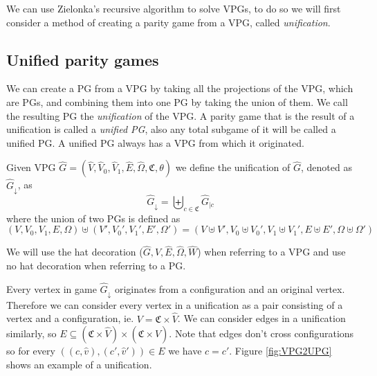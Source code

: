 We can use Zielonka's recursive algorithm to solve VPGs, to do so we will first consider a method of creating a parity game from a VPG, called \textit{unification}.
\subsection{Unified parity games}
We can create a PG from a VPG by taking all the projections of the VPG, which are PGs, and combining them into one PG by taking the union of them. We call the resulting PG the \textit{unification} of the VPG. A parity game that is the result of a unification is called a \textit{unified PG}, also any total subgame of it will be called a unified PG. A unified PG always has a VPG from which it originated.
\begin{definition}
	Given VPG $\hat{G} = (\hat{V},\hat{V}_0,\hat{V}_1, \hat{E},\hat{\Omega}, \mathfrak{C},\theta)$ we define the unification of $\hat{G}$, denoted as $\hat{G}_{\downarrow}$, as
	\[  \hat{G}_{\downarrow} = \biguplus_{c\in \mathfrak{C}}\hat{G}_{|c} \]
	where the union of two PGs is defined as
	\[ (V,V_0,V_1,E,\Omega) \uplus (V',V_0',V_1',E',\Omega') = (V \uplus V', V_0 \uplus V_0', V_1 \uplus V_1', E \uplus E', \Omega \uplus \Omega') \]
\end{definition}
We will use the hat decoration ($\hat{G},\hat{V},\hat{E},\hat{\Omega},\hat{W}$) when referring to a VPG and use no hat decoration when referring to a PG.

Every vertex in game $\hat{G}_{\downarrow}$ originates from a configuration and an original vertex. Therefore we can consider every vertex in a unification as a pair consisting of a vertex and a configuration, ie. $V = \mathfrak{C} \times \hat{V}$. We can consider edges in a unification similarly, so $E \subseteq (\mathfrak{C} \times \hat{V}) \times (\mathfrak{C} \times \hat{V})$. Note that edges don't cross configurations so for every $((c,\hat{v}) , (c',\hat{v}')) \in E$ we have $c = c'$. Figure \ref{fig:VPG2UPG} shows an example of a unification.

